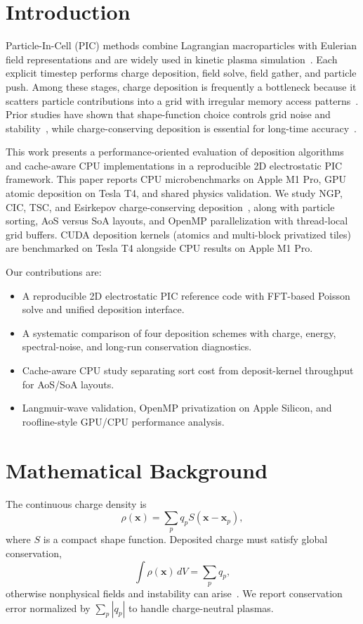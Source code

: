 \section{Introduction}
Particle-In-Cell (PIC) methods combine Lagrangian macroparticles with Eulerian field representations and are widely used in kinetic plasma simulation~\cite{birdsall1991,hockney1988,dawson1983}.
Each explicit timestep performs charge deposition, field solve, field gather, and particle push.
Among these stages, charge deposition is frequently a bottleneck because it scatters particle contributions into a grid with irregular memory access patterns~\cite{viereck2016}.
Prior studies have shown that shape-function choice controls grid noise and stability~\cite{langdon1970}, while charge-conserving deposition is essential for long-time accuracy~\cite{esirkepov2001,harvey2015}.

This work presents a performance-oriented evaluation of deposition algorithms and cache-aware CPU implementations in a reproducible 2D electrostatic PIC framework.
This paper reports CPU microbenchmarks on Apple M1 Pro, GPU atomic deposition on Tesla T4, and shared physics validation.
We study NGP, CIC, TSC, and Esirkepov charge-conserving deposition~\cite{esirkepov2001}, along with particle sorting, AoS versus SoA layouts, and OpenMP parallelization with thread-local grid buffers.
CUDA deposition kernels (atomics and multi-block privatized tiles) are benchmarked on Tesla T4 alongside CPU results on Apple M1 Pro.

Our contributions are:
\begin{itemize}
    \item A reproducible 2D electrostatic PIC reference code with FFT-based Poisson solve and unified deposition interface.
    \item A systematic comparison of four deposition schemes with charge, energy, spectral-noise, and long-run conservation diagnostics.
    \item Cache-aware CPU study separating sort cost from deposit-kernel throughput for AoS/SoA layouts.
    \item Langmuir-wave validation, OpenMP privatization on Apple Silicon, and roofline-style GPU/CPU performance analysis.
\end{itemize}

\section{Mathematical Background}
The continuous charge density is
\begin{equation}
    \rho(\mathbf{x}) = \sum_p q_p S(\mathbf{x}-\mathbf{x}_p),
\end{equation}
where $S$ is a compact shape function.
Deposited charge must satisfy global conservation,
\begin{equation}
    \int \rho(\mathbf{x})\, dV = \sum_p q_p,
\end{equation}
otherwise nonphysical fields and instability can arise~\cite{brackbill1980}.
We report conservation error normalized by $\sum_p |q_p|$ to handle charge-neutral plasmas.

